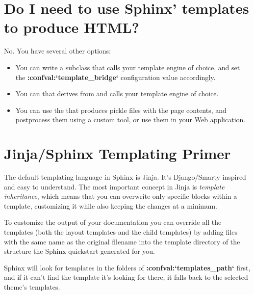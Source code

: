 \documentclass[letterpaper,10pt,english]{sphinxmanual}
\begin{document}
\section{Do I need to use Sphinx' templates to produce HTML?}
\label{templating:do-i-need-to-use-sphinx-templates-to-produce-html}
No.  You have several other options:
\begin{itemize}
\item {} 
You can write a  subclass that
calls your template engine of choice, and set the {\color{red}\bfseries{}:confval:{}`template\_bridge{}`}
configuration value accordingly.

\item {} 
You can {\hyperref[ext/builderapi:writing\string-builders]{}} that derives from
{\hyperref[builders:sphinx.builders.html.StandaloneHTMLBuilder]{}} and calls your template
engine of choice.

\item {} 
You can use the {\hyperref[builders:sphinx.builders.html.PickleHTMLBuilder]{}} that produces
pickle files with the page contents, and postprocess them using a custom tool,
or use them in your Web application.

\end{itemize}


\section{Jinja/Sphinx Templating Primer}
\label{templating:jinja-sphinx-templating-primer}
The default templating language in Sphinx is Jinja.  It's Django/Smarty inspired
and easy to understand.  The most important concept in Jinja is \emph{template
inheritance}, which means that you can overwrite only specific blocks within a
template, customizing it while also keeping the changes at a minimum.

To customize the output of your documentation you can override all the templates
(both the layout templates and the child templates) by adding files with the
same name as the original filename into the template directory of the structure
the Sphinx quickstart generated for you.

Sphinx will look for templates in the folders of {\color{red}\bfseries{}:confval:{}`templates\_path{}`}
first, and if it can't find the template it's looking for there, it falls back
to the selected theme's templates.
\end{document}
